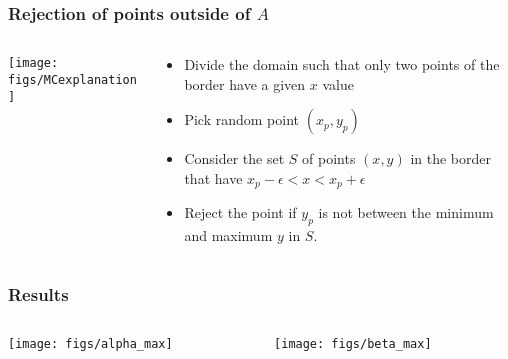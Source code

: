 \documentclass{beamer}
\begin{document}
\begin{frame}
\frametitle{Rejection of points outside of $A$}

\begin{columns}
\begin{column}{0.5\textwidth}
\texttt{[image: figs/MCexplanation]}
\end{column}

\begin{column}{0.5\textwidth}

\begin{itemize}
\item Divide the domain such that only two points of the border have a given $x$ value
\item Pick random point $(x_p,y_p)$
\item Consider the set $S$ of points $(x,y)$ in the border that have $x_p-\epsilon<x<x_p+\epsilon$
\item Reject the point if $y_p$ is not between the minimum and maximum $y$ in $S$.
\end{itemize}

\end{column}
\end{columns}
\end{frame}



\begin{frame}
\frametitle{Results}
\begin{columns}
\begin{column}{0.5\textwidth}
  \texttt{[image: figs/alpha\_max]}
\end{column}
\begin{column}{0.5\textwidth}
  \texttt{[image: figs/beta\_max]}
\end{column}
\end{columns}
\end{frame}


\end{document}
